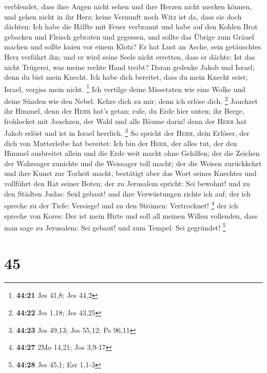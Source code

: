 verblendet, dass ihre Augen nicht sehen und ihre Herzen nicht merken
können,  und gehen nicht in ihr Herz; keine Vernunft noch
Witz ist da, dass sie doch dächten: Ich habe die Hälfte mit Feuer
verbrannt und habe auf den Kohlen Brot gebacken und Fleisch gebraten und
gegessen, und sollte das Übrige zum Gräuel machen und sollte knien vor
einem Klotz?  Er hat Lust an Asche, sein getäuschtes Herz
verführt ihn; und er wird seine Seele nicht erretten, dass er dächte:
Ist das nicht Trügerei, was meine rechte Hand treibt? 
Daran gedenke Jakob und Israel; denn du bist mein Knecht. Ich habe dich
bereitet, dass du mein Knecht seist; Israel, vergiss mein nicht.
\footnote{\textbf{44:21} Jes 41,8; Jes 44,2}  Ich
vertilge deine Missetaten wie eine Wolke und deine Sünden wie den Nebel.
Kehre dich zu mir; denn ich erlöse dich. \footnote{\textbf{44:22} Jes
  1,18; Jes 43,25}  Jauchzet ihr Himmel, denn der
\textsc{Herr} hat's getan; rufe, du Erde hier unten; ihr Berge,
frohlocket mit Jauchzen, der Wald und alle Bäume darin! denn der
\textsc{Herr} hat Jakob erlöst und ist in Israel herrlich. \footnote{\textbf{44:23}
  Jes 49,13; Jes 55,12; Ps 96,11}  So spricht der
\textsc{Herr}, dein Erlöser, der dich von Mutterleibe hat bereitet: Ich
bin der \textsc{Herr}, der alles tut, der den Himmel ausbreitet allein
und die Erde weit macht ohne Gehilfen;  der die Zeichen
der Wahrsager zunichte und die Weissager toll macht; der die Weisen
zurückkehrt und ihre Kunst zur Torheit macht,  bestätigt
aber das Wort seines Knechtes und vollführt den Rat seiner Boten; der zu
Jerusalem spricht: Sei bewohnt! und zu den Städten Judas: Seid gebaut!
und ihre Verwüstungen richte ich auf;  der ich spreche zu
der Tiefe: Versiege! und zu den Strömen: Vertrocknet! \footnote{\textbf{44:27}
  2Mo 14,21; Jos 3,9-17}  der ich spreche von Kores: Der
ist mein Hirte und soll all meinen Willen vollenden, dass man sage zu
Jerusalem: Sei gebaut! und zum Tempel: Sei gegründet! \footnote{\textbf{44:28}
  Jes 45,1; Esr 1,1-3}

\hypertarget{section-15}{%
\section{45}\label{section-15}}

